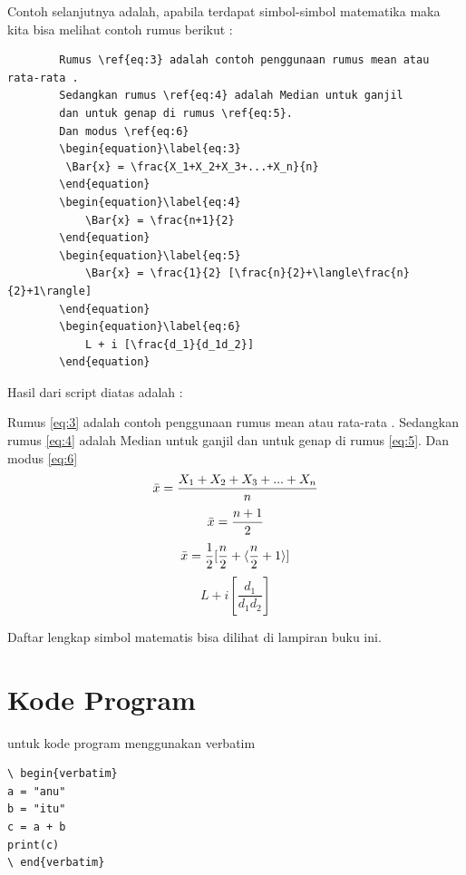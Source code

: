 Contoh selanjutnya adalah, apabila terdapat simbol-simbol matematika maka kita bisa melihat contoh rumus berikut :

    \begin{verbatim}
		Rumus \ref{eq:3} adalah contoh penggunaan rumus mean atau rata-rata .
		Sedangkan rumus \ref{eq:4} adalah Median untuk ganjil  
		dan untuk genap di rumus \ref{eq:5}.
		Dan modus \ref{eq:6}
		\begin{equation}\label{eq:3}
		 \Bar{x} = \frac{X_1+X_2+X_3+...+X_n}{n}    
		\end{equation}
		\begin{equation}\label{eq:4}
		    \Bar{x} = \frac{n+1}{2}
		\end{equation}
		\begin{equation}\label{eq:5}
		    \Bar{x} = \frac{1}{2} [\frac{n}{2}+\langle\frac{n}{2}+1\rangle]
		\end{equation}
		\begin{equation}\label{eq:6}
		    L + i [\frac{d_1}{d_1d_2}]
		\end{equation}
    \end{verbatim}

Hasil dari script diatas adalah :

Rumus \ref{eq:3} adalah contoh penggunaan rumus mean atau rata-rata .
Sedangkan rumus \ref{eq:4} adalah Median untuk ganjil  
dan untuk genap di rumus \ref{eq:5}.
Dan modus \ref{eq:6}
\begin{equation}\label{eq:3}
 \Bar{x} = \frac{X_1+X_2+X_3+...+X_n}{n}    
\end{equation}
\begin{equation}\label{eq:4}
    \Bar{x} = \frac{n+1}{2}
\end{equation}
\begin{equation}\label{eq:5}
    \Bar{x} = \frac{1}{2} [\frac{n}{2}+\langle\frac{n}{2}+1\rangle]
\end{equation}
\begin{equation}\label{eq:6}
    L + i [\frac{d_1}{d_1d_2}]
\end{equation}

Daftar lengkap simbol matematis bisa dilihat di lampiran buku ini.



\section{Kode Program}
untuk kode program menggunakan verbatim
\begin{verbatim}
\ begin{verbatim}
a = "anu"
b = "itu"
c = a + b
print(c) 
\ end{verbatim}
\end{verbatim}


